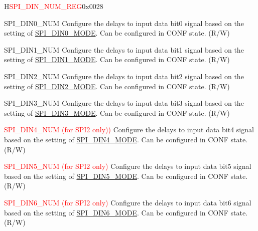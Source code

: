 \begin{register}{H}{\textcolor{red}{SPI\_DIN\_NUM\_REG}}{0x{}0028}\label{regdesc:SPIDINNUMREG}
%
%
%
%
%
%
%
%
%
\regnewline%
\begin{regdesc}\begin{reglist}
\label{fielddesc:SPIDIN0NUM}\item [SPI\_DIN0\_NUM] Configure the delays to input data bit0 signal based on the setting of \hyperref[fielddesc:SPIDIN0MODE]{SPI\_DIN0\_MODE}. Can be configured in CONF state. (R/W)

\label{fielddesc:SPIDIN1NUM}\item [SPI\_DIN1\_NUM] Configure the delays to input data bit1 signal based on the setting of \hyperref[fielddesc:SPIDIN1MODE]{SPI\_DIN1\_MODE}. Can be configured in CONF state. (R/W)

\label{fielddesc:SPIDIN2NUM}\item [SPI\_DIN2\_NUM] Configure the delays to input data bit2 signal based on the setting of \hyperref[fielddesc:SPIDIN2MODE]{SPI\_DIN2\_MODE}. Can be configured in CONF state. (R/W)

\label{fielddesc:SPIDIN3NUM}\item [SPI\_DIN3\_NUM] Configure the delays to input data bit3 signal based on the setting of \hyperref[fielddesc:SPIDIN3MODE]{SPI\_DIN3\_MODE}. Can be configured in CONF state. (R/W)

\label{fielddesc:SPIDIN4NUM}\item [\textcolor{red}{SPI\_DIN4\_NUM (for SPI2 only))}] Configure the delays to input data bit4 signal based on the setting of \hyperref[fielddesc:SPIDIN4MODE]{SPI\_DIN4\_MODE}. Can be configured in CONF state. (R/W)

\label{fielddesc:SPIDIN5NUM}\item [\textcolor{red}{SPI\_DIN5\_NUM (for SPI2 only)}] Configure the delays to input data bit5 signal based on the setting of \hyperref[fielddesc:SPIDIN5MODE]{SPI\_DIN5\_MODE}. Can be configured in CONF state. (R/W)

\label{fielddesc:SPIDIN6NUM}\item [\textcolor{red}{SPI\_DIN6\_NUM (for SPI2 only)}] Configure the delays to input data bit6 signal based on the setting of \hyperref[fielddesc:SPIDIN6MODE]{SPI\_DIN6\_MODE}. Can be configured in CONF state. (R/W)


\end{reglist}
\end{regdesc}
\end{register}

